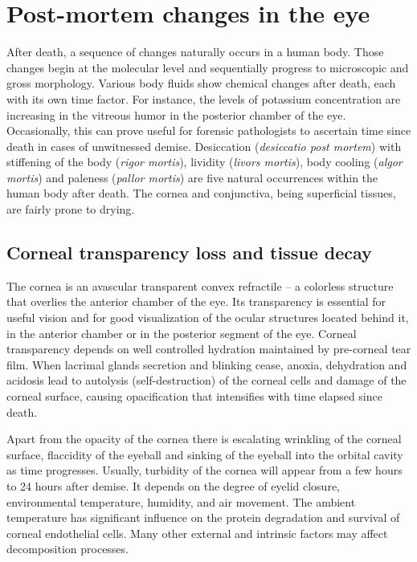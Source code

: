 \documentclass[10pt,twocolumn,letterpaper]{article}
\begin{document}
\section{Post-mortem changes in the eye}
\label{sec:Medical}
After death, a sequence of changes naturally occurs in a human body. Those changes begin at the molecular level and sequentially progress to microscopic and gross morphology. Various body fluids show chemical changes after death, each with its own time factor. For instance, the levels of potassium concentration are increasing in the vitreous humor in the posterior chamber of the eye. Occasionally, this can prove useful for forensic pathologists to ascertain time since death in cases of unwitnessed demise. Desiccation (\emph{desiccatio post mortem}) with stiffening of the body (\emph{rigor mortis}), lividity (\emph{livors mortis}), body cooling (\emph{algor mortis}) and paleness (\emph{pallor mortis}) are five natural occurrences within the human body after death. The cornea and conjunctiva, being superficial tissues, are fairly prone to drying.

\subsection{Corneal transparency loss and tissue decay}
The cornea is an avascular transparent convex refractile -- a colorless structure that overlies the anterior chamber of the eye. Its transparency is essential for useful vision and for good visualization of the ocular structures located behind it, in the anterior chamber or in the posterior segment of the eye. Corneal transparency depends on well controlled hydration maintained by pre-corneal tear film. When lacrimal glands secretion and blinking cease, anoxia, dehydration and acidosis lead to autolysis (self-destruction) of the corneal cells and damage of the corneal surface, causing opacification that intensifies with time elapsed since death.

Apart from the opacity of the cornea there is escalating wrinkling of the corneal surface, flaccidity of the eyeball and sinking of the eyeball into the orbital cavity as time progresses. Usually, turbidity of the cornea will appear from a few hours to 24 hours after demise. It depends on the degree of eyelid closure, environmental temperature, humidity, and air movement. The ambient temperature has significant influence on the protein degradation and survival of corneal endothelial cells. Many other external and intrinsic factors may affect decomposition processes.
\end{document}
